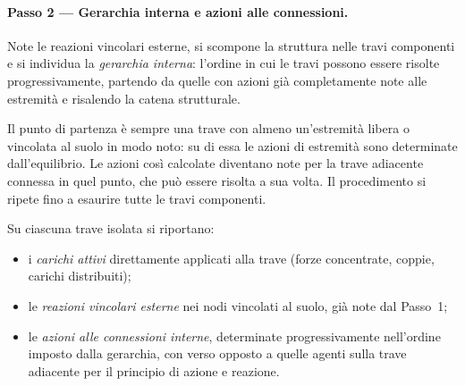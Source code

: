 \paragraph{Passo 2 --- Gerarchia interna e azioni
	alle connessioni.}

Note le reazioni vincolari esterne, si scompone
la struttura nelle travi componenti e si individua
la \emph{gerarchia interna}: l'ordine in cui le
travi possono essere risolte progressivamente,
partendo da quelle con azioni già completamente
note alle estremità e risalendo la catena
strutturale.

Il punto di partenza è sempre una trave con
almeno un'estremità libera o vincolata al suolo
in modo noto: su di essa le azioni di estremità
sono determinate dall'equilibrio. Le azioni
così calcolate diventano note per la trave
adiacente connessa in quel punto, che può
essere risolta a sua volta. Il procedimento
si ripete fino a esaurire tutte le travi
componenti.

Su ciascuna trave isolata si riportano:
\begin{itemize}
	\item i \emph{carichi attivi} direttamente
	applicati alla trave (forze concentrate,
	coppie, carichi distribuiti);
	\item le \emph{reazioni vincolari esterne}
	nei nodi vincolati al suolo, già note
	dal Passo~1;
	\item le \emph{azioni alle connessioni
		interne}, determinate progressivamente
	nell'ordine imposto dalla gerarchia,
	con verso opposto a quelle agenti sulla
	trave adiacente per il principio di
	azione e reazione.
\end{itemize}

